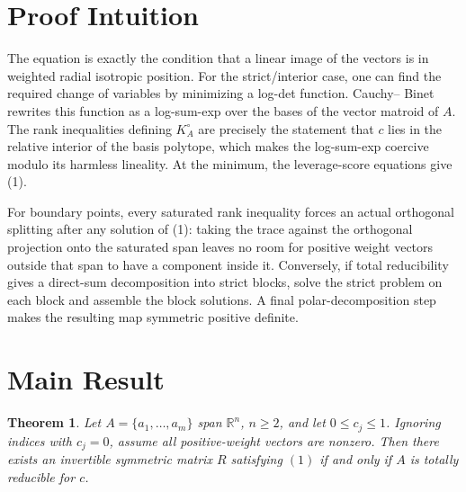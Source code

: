 \documentclass[11pt]{article}
\newtheorem{theorem}{Theorem}
\newcommand{\R}{\mathbb R}
\begin{document}
\section*{Proof Intuition}

The equation is exactly the condition that a linear image of the vectors is in
weighted radial isotropic position.  For the strict/interior case, one can find
the required change of variables by minimizing a log-det function.  Cauchy--
Binet rewrites this function as a log-sum-exp over the bases of the vector
matroid of \(A\).  The rank inequalities defining \(K_A^\circ\) are precisely
the statement that \(c\) lies in the relative interior of the basis polytope,
which makes the log-sum-exp coercive modulo its harmless lineality.  At the
minimum, the leverage-score equations give (1).

For boundary points, every saturated rank inequality forces an actual
orthogonal splitting after any solution of (1): taking the trace against the
orthogonal projection onto the saturated span leaves no room for positive
weight vectors outside that span to have a component inside it.  Conversely,
if total reducibility gives a direct-sum decomposition into strict blocks, solve
the strict problem on each block and assemble the block solutions.  A final
polar-decomposition step makes the resulting map symmetric positive definite.

\section*{Main Result}

\begin{theorem}
Let \(A=\{a_1,\ldots,a_m\}\) span \(\R^n\), \(n\ge2\), and let
\(0\le c_j\le1\).  Ignoring indices with \(c_j=0\), assume all positive-weight
vectors are nonzero.  Then there exists an invertible symmetric matrix \(R\)
satisfying \((1)\) if and only if \(A\) is totally reducible for \(c\).
\end{theorem}
\end{document}
